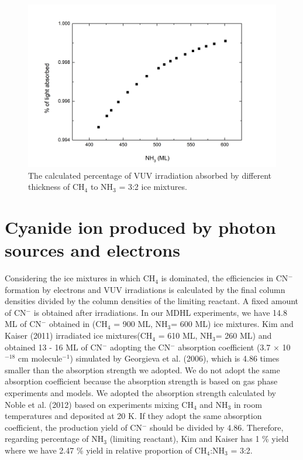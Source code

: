 \begin{figure}
\centering
\includegraphics[width=\textwidth]{figures/chapter4/absorption_percentage.png}
\caption{The calculated percentage of VUV irradiation absorbed by different thickness of CH$_4$ to NH$_3$ = 3:2 ice mixtures.}
\label{fig:absorption_percentage}
\end{figure}

\section{Cyanide ion produced by photon sources and electrons} %

Considering the ice mixtures in which CH$_4$ is dominated, the efficiencies in CN$^-$ formation by electrons and VUV irradiations is calculated by the final column densities divided by the column densities of the limiting reactant. A fixed amount of CN$^-$ is obtained after irradiations. In our MDHL experiments, we have 14.8 ML of CN$^-$ obtained in (CH$_4$ = 900 ML, NH$_3$= 600 ML) ice mixtures. Kim and Kaiser (2011) irradiated  ice mixtures(CH$_4$ = 610 ML, NH$_3$= 260 ML) and obtained 13 - 16 ML of CN$^-$ adopting the CN$^-$ absorption coefficient (3.7 $\times$ 10$^{-18}$ cm molecule$^{-1}$) simulated by Georgieva et al. (2006)\cite{georgieva2006computational}, which is 4.86 times smaller than the absorption strength we adopted. We do not adopt the same absorption coefficient because the absorption strength is based on gas phase experiments and models. We adopted the absorption strength calculated by Noble et al. (2012) \cite{noble2012thermal} based on experiments mixing CH$_4$ and NH$_3$ in room temperatures and deposited at 20 K. If they adopt the same absorption coefficient, the production yield of CN$^-$ should be divided by 4.86. Therefore, regarding percentage of NH$_3$ (limiting reactant), Kim and Kaiser has 1 \% yield where we have 2.47 \% yield in relative proportion of CH$_4$:NH$_3$ = 3:2.

